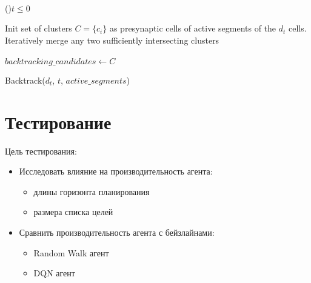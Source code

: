 \documentclass[a4paper]{article}
\begin{document}
\begin{function}
  \quad \\
  
  \If(){$t \leq 0$} {
  }{}

  Init set of clusters $C = \{c_i\}$ as presynaptic cells of active segments of the $d_t$ cells. \;
  Iteratively merge any two sufficiently intersecting clusters \;
  \quad \\

  \quad \\

  $backtracking\_candidates \leftarrow C$ \;


  \caption{Backtrack($d_t$, $t$, $active\_segments$)}
\end{function}

\section{Тестирование}

Цель тестирования:

\begin{itemize}
    \item Исследовать влияние на производительность агента:
    \begin{itemize}
        \item длины горизонта планирования
        \item размера списка целей
    \end{itemize}
    
    \item Сравнить производительность агента с бейзлайнами:
    \begin{itemize}
        \item Random Walk агент
        \item DQN агент
    \end{itemize}
\end{itemize}
\end{document}
